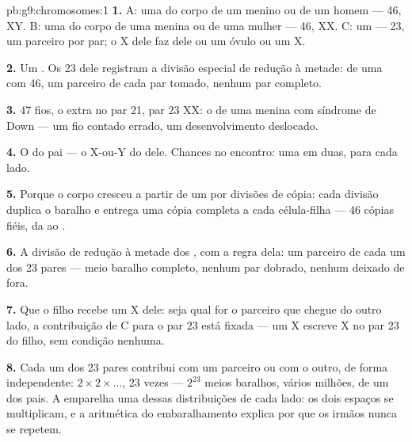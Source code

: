 \begin{solution}{pb:g9:chromosomes:1}
\textbf{1.} A: uma  do corpo de um menino ou de um
homem --- 46, XY. B: uma  do corpo de uma menina ou de
uma mulher --- 46, XX. C: um  --- 23, um parceiro por
par; o X dele faz dele ou um óvulo ou um  X.

\textbf{2.} Um . Os 23 dele registram a divisão
especial de redução à metade: de uma  com 46, um
parceiro de cada par tomado, nenhum par completo.

\textbf{3.} 47 fios, o extra no par 21, par 23 XX: o
 de uma menina com síndrome de Down --- um fio
contado errado, um desenvolvimento deslocado.

\textbf{4.} O do pai --- o X-ou-Y do  dele.
Chances no encontro: uma em duas, para cada lado.

\textbf{5.} Porque o corpo cresceu a partir de um  por
divisões de cópia: cada divisão duplica o baralho e entrega
uma cópia completa a cada célula-filha --- 46 cópias fiéis,
da  ao .

\textbf{6.} A divisão de redução à metade dos , com a
regra dela: um parceiro de cada um dos 23 pares --- meio
baralho completo, nenhum par dobrado, nenhum deixado de
fora.

\textbf{7.} Que o filho recebe um X dele: seja qual for o
parceiro que chegue do outro lado, a contribuição de C para
o par 23 está fixada --- um  X escreve X no par 23 do
filho, sem condição nenhuma.

\textbf{8.} Cada um dos 23 pares contribui com um parceiro
ou com o outro, de forma independente:
$2 \times 2 \times \dots$, 23 vezes --- $2^{23}$ meios
baralhos, vários milhões, de um dos pais. A 
emparelha uma dessas distribuições de cada lado: os dois
espaços se multiplicam, e a aritmética do embaralhamento
explica por que os irmãos nunca se repetem.


\end{solution}
